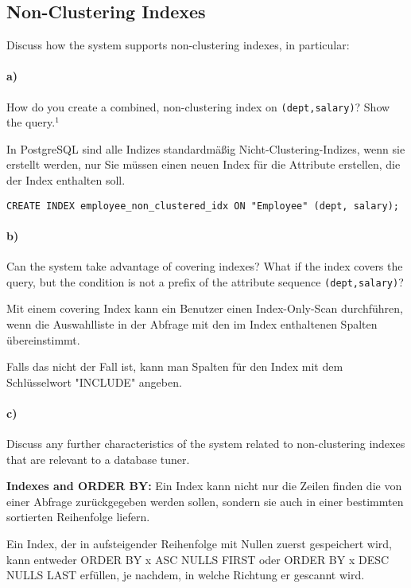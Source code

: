 \documentclass[11pt]{scrartcl}
\begin{document}
\subsection{Non-Clustering Indexes}

Discuss how the system supports non-clustering indexes, in particular:

\paragraph{a)}

How do you create a combined, non-clustering index on \texttt{(dept,salary)}? Show the query.$^1$

In PostgreSQL sind alle Indizes standardmäßig Nicht-Clustering-Indizes, wenn sie erstellt werden, nur Sie
müssen einen neuen Index für die Attribute erstellen, die der Index enthalten soll.

\begin{lstlisting}[style=dbtsql]
CREATE INDEX employee_non_clustered_idx ON "Employee" (dept, salary);
\end{lstlisting}

\paragraph{b)}

Can the system take advantage of covering indexes? What if the index covers the query, but the condition is not a prefix of the attribute sequence \texttt{(dept,salary)}?

Mit einem covering Index kann ein Benutzer einen Index-Only-Scan durchführen, wenn die Auswahlliste in der Abfrage mit den im Index enthaltenen Spalten übereinstimmt.

Falls das nicht der Fall ist, kann man Spalten für den Index mit dem Schlüsselwort "INCLUDE" angeben. 

\paragraph{c)}

Discuss any further characteristics of the system related to non-clustering indexes that are relevant to a database tuner.

\textbf{Indexes and ORDER BY:} Ein Index kann nicht nur die Zeilen finden die von einer Abfrage zurückgegeben werden sollen, sondern sie auch in einer bestimmten sortierten Reihenfolge liefern. 

Ein Index, der in aufsteigender Reihenfolge mit Nullen zuerst gespeichert wird, kann entweder ORDER BY x ASC NULLS FIRST oder ORDER BY x DESC NULLS LAST erfüllen, je nachdem, in welche Richtung er gescannt wird.
\end{document}
